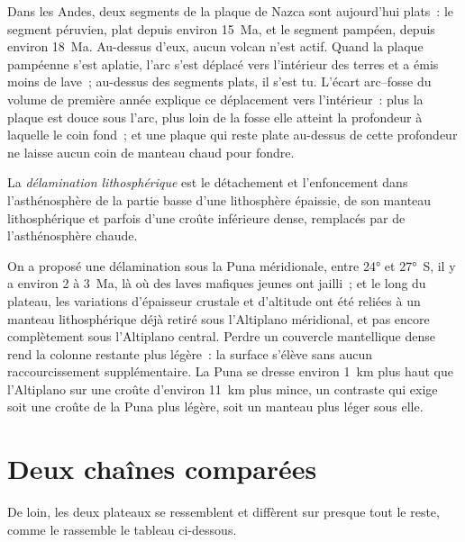 Dans les Andes, deux segments de la plaque de Nazca sont aujourd'hui plats~: le segment péruvien, plat
depuis environ \qty{15}{Ma}, et le segment pampéen, depuis environ \qty{18}{Ma}. Au-dessus d'eux,
aucun volcan n'est actif. Quand la plaque pampéenne s'est aplatie, l'arc s'est déplacé vers l'intérieur
des terres et a émis moins de lave~; au-dessus des segments plats, il s'est tu. L'écart arc--fosse
du volume de première année explique ce déplacement vers l'intérieur~: plus la plaque est douce
sous l'arc, plus loin de la fosse elle atteint la profondeur à laquelle le coin fond~; et une plaque
qui reste plate au-dessus de cette profondeur ne laisse aucun coin de manteau chaud pour fondre.

\begin{definition}\label{def:b2:himalaya-andes:delamination}
La \emph{délamination lithosphérique} est le détachement et
l'enfoncement dans l'asthénosphère de la partie basse d'une lithosphère épaissie, de son manteau
lithosphérique et parfois d'une croûte inférieure dense, remplacés par de l'asthénosphère chaude.
\end{definition}

On a proposé une délamination sous la Puna méridionale, entre \ang{24} et \ang{27}~S, il y
a environ 2 à \qty{3}{Ma}, là où des laves mafiques jeunes ont jailli~; et le long du plateau,
les variations d'épaisseur crustale et d'altitude ont été reliées à un manteau lithosphérique
déjà retiré sous l'Altiplano méridional, et pas encore complètement sous l'Altiplano
central. Perdre un couvercle mantellique dense rend la colonne restante plus légère~: la
surface s'élève sans aucun raccourcissement supplémentaire. La Puna se dresse environ \qty{1}{km}
plus haut que l'Altiplano sur une croûte d'environ \qty{11}{km} plus mince, un contraste
qui exige soit une croûte de la Puna plus légère, soit un manteau plus léger sous elle.

\section{Deux chaînes comparées}\label{sec:b2:himalaya-andes:compared}

De loin, les deux plateaux se ressemblent et diffèrent sur
presque tout le reste, comme le rassemble le tableau ci-dessous.


